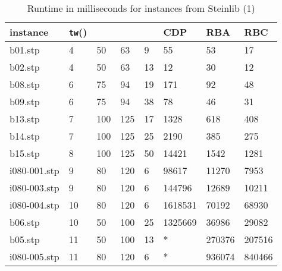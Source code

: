 \documentclass{llncs}
\begin{document}
\begin{table}[!h]
\begin{center}
\begin{tabular}{l l l l l | l l l }
\hline
instance & \texttt{tw}() &  &  &  & CDP & RBA & RBC\\
\hline
\hline
b01.stp	&	4	&	50	&	63	&	9	&	55	&	53	&	17	\\
b02.stp	&	4	&	50	&	63	&	13	&	12	&	30	&	12	\\
b08.stp	&	6	&	75	&	94	&	19	&	171	&	92	&	48	\\
b09.stp	&	6	&	75	&	94	&	38	&	78	&	46	&	31	\\
b13.stp	&	7	&	100	&	125	&	17	&	1328	&	618	&	408	\\
b14.stp	&	7	&	100	&	125	&	25	&	2190	&	385	&	275	\\
b15.stp	&	8	&	100	&	125	&	50	&	14421	&	1542	&	1281	\\
i080-001.stp	&	9	&	80	&	120	&	6	&	98617	&	11270	&	7953	\\
i080-003.stp	&	9	&	80	&	120	&	6	&	144796	&	12689	&	10211	\\
i080-004.stp	&	10	&	80	&	120	&	6	&	1618531	&	70192	&	68930	\\
b06.stp	&	10	&	50	&	100	&	25	&	1325669	&	36986	&	29082	\\
b05.stp	&	11	&	50	&	100	&	13	&	*	&	270376	&	207516\\
i080-005.stp &	11	&	80	&	120	&	6	&	*	&	936074	&	840466\\
\hline
\end{tabular}
\end{center}
\caption{Runtime in milliseconds for instances from Steinlib (1)}
\label{t1:a}
\end{table}
\end{document}
